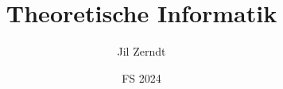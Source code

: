 \documentclass[a4paper, fontsize = 8pt, landscape]{scrartcl}
\title{Theoretische Informatik}
\author{Jil Zerndt}
\date{FS 2024}
\begin{document}
\begin{multicols*}{3}
    \thispagestyle{TitlePageStyle}
		\maketitle

    
    \raggedcolumns
    
    \raggedcolumns
    
    \raggedcolumns
    
    \raggedcolumns
    
    \raggedcolumns
    
    \raggedcolumns
    
    \raggedcolumns
    
    \raggedcolumns
    \columnbreak
    
    \raggedcolumns
    \columnbreak
    
    \raggedcolumns

    

\end{multicols*}
\end{document}
